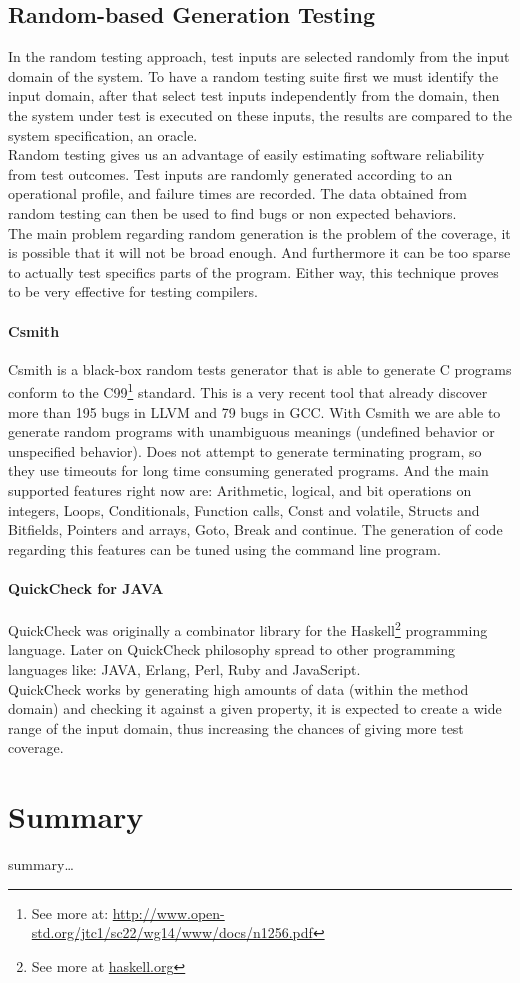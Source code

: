 \subsection{Random-based Generation Testing}
In the random testing approach, test inputs are selected randomly from the input domain of the system.
To have a random testing suite first we must identify the input domain, after that select test inputs independently from the domain,
then the system under test is executed on these inputs, the results are compared to the system specification, an oracle.\\
Random testing gives us an advantage of easily estimating software reliability from test outcomes.
Test inputs are randomly generated according to an operational profile, and failure times are recorded.
The data obtained from random testing can then be used to find bugs or non expected behaviors.\\
\indent The main problem regarding random generation is the problem of the coverage, it is possible that it will not be broad enough. And furthermore it can be
too sparse to actually test specifics parts of the program. Either way, this technique proves to be very effective for testing compilers.

\paragraph{Csmith}
Csmith\cite{Yang:2011:FUB:1993316.1993532} is a black-box random tests generator that is able to generate C programs
conform to the C99\footnote{See more at: \url{http://www.open-std.org/jtc1/sc22/wg14/www/docs/n1256.pdf}} standard. This is a very recent tool that already discover
more than 195 bugs in \ac{LLVM} and 79 bugs in \ac{GCC}. With Csmith we are able to generate random programs with unambiguous meanings (undefined behavior or 
unspecified behavior). Does not attempt to generate terminating program, so they use timeouts for long time consuming generated programs.
And the main supported features right now are: Arithmetic, logical, and bit operations on integers, Loops, Conditionals, Function calls, Const and volatile,
Structs and Bitfields, Pointers and arrays, Goto, Break and continue. The generation of code regarding this features can be tuned using the command line program.

\paragraph{QuickCheck for JAVA}
QuickCheck was originally a combinator library for the Haskell\footnote{See more at \url{haskell.org}} programming language\cite{Claessen:2000:QLT:357766.351266}.
Later on QuickCheck philosophy spread to other programming languages like: JAVA, Erlang, Perl, Ruby and JavaScript.\\
QuickCheck works by generating high amounts of data (within the method domain) and checking it against a given property,
it is expected to create a wide range of the input domain, thus increasing the chances of giving more test coverage.

\section{Summary}
summary\ldots
\secendnote
